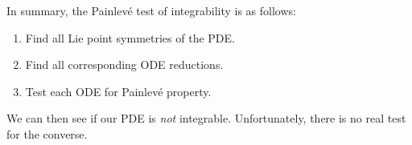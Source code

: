 \documentclass[a4paper]{article}
\begin{document}
In summary, the Painlev\'e test of integrability is as follows:
\begin{enumerate}
  \item Find all Lie point symmetries of the PDE.
  \item Find all corresponding ODE reductions.
  \item Test each ODE for Painlev\'e property.
\end{enumerate}
We can then see if our PDE is \emph{not} integrable. Unfortunately, there is no real test for the converse.

\printindex
\end{document}
